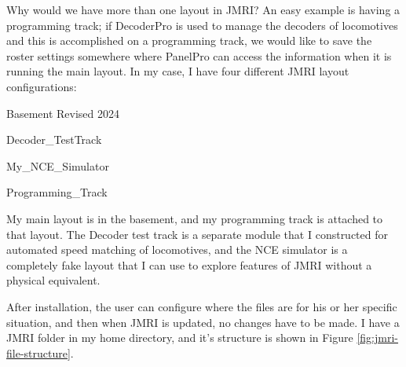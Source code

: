 Why would we have more than one layout in JMRI?  An easy example is having a programming track;  if DecoderPro is used to manage the decoders of
locomotives and this is accomplished on a programming track, we would like to save the roster settings somewhere where PanelPro can access the information when it is running the main layout.  In my case, I have four different JMRI layout configurations:
\begin{compactitem}
	\item{Basement Revised 2024}
	\item{Decoder\_TestTrack}
	\item{My\_NCE\_Simulator}
	\item{Programming\_Track}
\end{compactitem}

My main layout is in the basement, and my programming track is attached to that layout.  The Decoder test track is a separate module that I constructed for
automated speed matching of locomotives, and the NCE simulator is a completely fake layout that I can use to explore features of JMRI without a physical
equivalent.

After installation, the user can configure where the files are for his or her specific situation, and then when JMRI is updated, no changes have to be made.
I have a JMRI folder in my home directory, and it's structure is shown in Figure \vref{fig:jmri-file-structure}.


